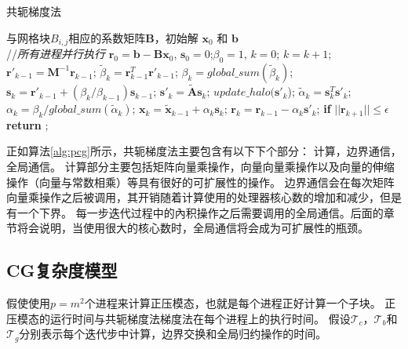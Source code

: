 \begin{algorithm}[h]
\caption{共轭梯度法}
\label{alg:pcg}
\begin{algorithmic}[1]
\REQUIRE  与网格块$B_{i,j}$相应的系数矩阵$\textbf{B}$，初始解 $\textbf{x}_0$ 和 $\textbf{b}$  \\
//\qquad    \textit{所有进程并行执行}
\STATE $\textbf{r}_0 = \textbf{b}-\textbf{B}\textbf{x}_0$, $\textbf{s}_0 =0$;\quad $\beta_0=1$, $k=0$;
\STATE $k=k+1$; 
\STATE $\textbf{r}'_{k-1} =\textbf{M}^{-1}\textbf{r}_{k-1}$;  \label{AlgPcgPrecond}
\STATE $\tilde{\beta}_k = \textbf{r}_{k-1}^T\textbf{r}'_{k-1}$; \label{AlgPcgInner1}
\STATE $\beta_k = global\_sum(\tilde{\beta}_k)$;  \label{AlgPcgGlobal1}
\STATE $\textbf{s}_k = \textbf{r}'_{k-1} +(\beta_k/\beta_{k-1})\textbf{s}_{k-1}$;\label{AlgPcgVec1}
\STATE $\textbf{s}'_k = \tilde{\textbf{A}}\textbf{s}_k$; \label{AlgPcgAx}
\STATE $update\_halo(\textbf{s}'_k$); \label{AlgPcgBound}
\STATE $\tilde{\alpha}_k = \textbf{s}_k^T\textbf{s}'_k$; \label{AlgPcgInner2}
\STATE $\alpha_k =\beta_k/ global\_sum(\tilde{\alpha}_k)$;\quad {}\label{AlgPcgGlobal2}
\STATE $\textbf{x}_k =\tilde{\textbf{x}}_{k-1} +\alpha_k \textbf{s}_k$;\label{AlgPcgVec2}
\STATE $\textbf{r}_k =\textbf{r}_{k-1} -\alpha_k\textbf{s}'_k$;\label{AlgPcgVec3}
\STATE \textbf{if} $||\textbf{r}_{k+1}|| \le \epsilon$  \textbf{return} ;
\ENDIF
\ENDWHILE
\end{algorithmic}
\end{algorithm}

 
正如算法\ref{alg:pcg}所示，共轭梯度法主要包含有以下下个部分： 计算，边界通信，全局通信。
计算部分主要包括矩阵向量乘操作，向量向量乘操作以及向量的伸缩操作（向量与常数相乘）等具有很好的可扩展性的操作。 
边界通信会在每次矩阵向量乘操作之后被调用，其开销随着计算使用的处理器核心数的增加和减少，但是有一个下界。 
每一步迭代过程中的內积操作之后需要调用的全局通信。后面的章节将会说明，当使用很大的核心数时，全局通信将会成为可扩展性的瓶颈。
 
\subsection{CG复杂度模型}
\label{solver:pcgComplex}
假使使用$p=m^2$个进程来计算正压模态，也就是每个进程正好计算一个子块。 
正压模态的运行时间与共轭梯度法梯度法在每个进程上的执行时间。 
假设$\mathcal{T}_c$，$\mathcal{T}_b$和$\mathcal{T}_g$分别表示每个迭代步中计算，边界交换和全局归约操作的时间。



